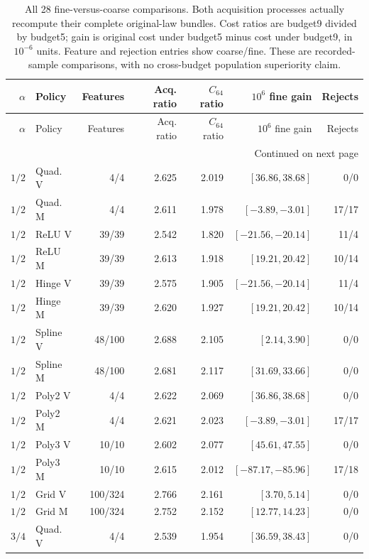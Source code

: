 \begingroup
\small\setlength{\tabcolsep}{3pt}
\begin{longtable}{rlrrrrr}
\caption{All 28 fine-versus-coarse comparisons. Both acquisition processes actually recompute their complete original-law bundles. Cost ratios are budget9 divided by budget5; gain is original cost under budget5 minus cost under budget9, in $10^{-6}$ units. Feature and rejection entries show coarse/fine. These are recorded-sample comparisons, with no cross-budget population superiority claim.}\label{tab:budgetscaling121}\\
\toprule
$\alpha$ & Policy & Features & Acq. ratio & $C_{64}$ ratio & $10^6$ fine gain & Rejects\\
\midrule\endfirsthead
\toprule
$\alpha$ & Policy & Features & Acq. ratio & $C_{64}$ ratio & $10^6$ fine gain & Rejects\\
\midrule\endhead
\midrule\multicolumn{7}{r}{Continued on next page}\\\endfoot
\bottomrule\endlastfoot
$1/2$ & Quad. V & 4/4 & 2.625 & 2.019 & $[36.86,38.68]$ & 0/0\\
$1/2$ & Quad. M & 4/4 & 2.611 & 1.978 & $[-3.89,-3.01]$ & 17/17\\
$1/2$ & ReLU V & 39/39 & 2.542 & 1.820 & $[-21.56,-20.14]$ & 11/4\\
$1/2$ & ReLU M & 39/39 & 2.613 & 1.918 & $[19.21,20.42]$ & 10/14\\
$1/2$ & Hinge V & 39/39 & 2.575 & 1.905 & $[-21.56,-20.14]$ & 11/4\\
$1/2$ & Hinge M & 39/39 & 2.620 & 1.927 & $[19.21,20.42]$ & 10/14\\
$1/2$ & Spline V & 48/100 & 2.688 & 2.105 & $[2.14,3.90]$ & 0/0\\
$1/2$ & Spline M & 48/100 & 2.681 & 2.117 & $[31.69,33.66]$ & 0/0\\
$1/2$ & Poly2 V & 4/4 & 2.622 & 2.069 & $[36.86,38.68]$ & 0/0\\
$1/2$ & Poly2 M & 4/4 & 2.621 & 2.023 & $[-3.89,-3.01]$ & 17/17\\
$1/2$ & Poly3 V & 10/10 & 2.602 & 2.077 & $[45.61,47.55]$ & 0/0\\
$1/2$ & Poly3 M & 10/10 & 2.615 & 2.012 & $[-87.17,-85.96]$ & 17/18\\
$1/2$ & Grid V & 100/324 & 2.766 & 2.161 & $[3.70,5.14]$ & 0/0\\
$1/2$ & Grid M & 100/324 & 2.752 & 2.152 & $[12.77,14.23]$ & 0/0\\
$3/4$ & Quad. V & 4/4 & 2.539 & 1.954 & $[36.59,38.43]$ & 0/0\\

\end{longtable}
